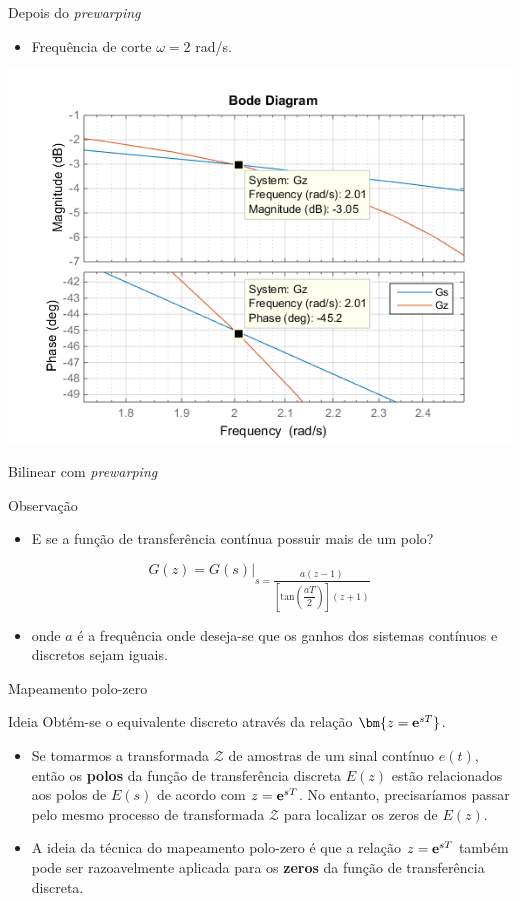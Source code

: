 \begin{frame}{\MATLAB}
\begin{block}{Depois do \textit{prewarping}}
\begin{itemize}
    \item Frequência de corte $\omega = 2$ rad/s.
\end{itemize}
\end{block}
\centerline{\includegraphics[width=0.7\linewidth]{Figuras/Ch08/fig8.png}}
\end{frame}

\begin{frame}{Bilinear com \textit{prewarping}}
\begin{block}{Observação}
\begin{itemize}
    \item E se a função de transferência contínua possuir mais de um polo?
\end{itemize}
$$G(z)=G(s)\Big|_{s=\dfrac{a(z-1)}{\left[\text{tan}\left(\dfrac{aT}{2}\right)\right](z+1)}}$$
\begin{itemize}
    \item[] onde $a$ é a frequência onde deseja-se que os ganhos dos sistemas contínuos e discretos sejam iguais.
\end{itemize}
\end{block}
\end{frame}

\begin{frame}{Mapeamento polo-zero}
\begin{block}{Ideia}
Obtém-se o equivalente discreto através da relação $ \bm{z=\text{\textbf{e}}^{sT}} $.
\begin{itemize}
    \item Se tomarmos a transformada $\mathcal{Z}$ de amostras de um sinal contínuo $e(t)$, então os \textbf{polos} da função de transferência discreta $E(z)$ estão relacionados aos polos de $E(s)$ de acordo com $z=\text{\textbf{e}}^{sT}$. No entanto, precisaríamos passar pelo mesmo processo de transformada $\mathcal{Z}$ para localizar os zeros de $E(z)$.
    \item A ideia da técnica do mapeamento polo-zero é que a relação $z=\text{\textbf{e}}^{sT}$ também pode ser razoavelmente aplicada para os \textbf{zeros} da função de transferência discreta.
\end{itemize}
\end{block}
\end{frame}

